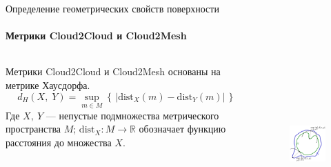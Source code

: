 \documentclass[aspectratio=169,xcolor=table]{beamer}
\begin{document}
\begin{frame}[t]{Определение геометрических свойств поверхности}
\framesubtitle{Метрики Cloud2Cloud и Cloud2Mesh}


\begin{columns}[T,onlytextwidth]
    \begin{column}{0.49\textwidth}
        Метрики Cloud2Cloud и Cloud2Mesh основаны на метрике Хаусдорфа.
\begin{equation*}
    d_{H}(X,\;Y)=\sup _{m\in M}\left\{\,|\mathrm {dist} _{X}(m)-\mathrm {dist} _{Y}(m)|\,\right\}
\end{equation*}
Где $X,\ Y$ --- непустые подмножества метрического пространства $M$; $\mathrm {dist} _{X}\colon M\to \mathbb {R}$ обозначает функцию расстояния до множества $X$.
    \end{column}
    \begin{column}{0.49\textwidth}
        \vspace{-0.8cm}
        \begin{figure}[H]
            \centering\includegraphics[height=6cm,width=1\textwidth,keepaspectratio]{Hausdorff_distance_sample.svg.png}
            \label{fig:Hausdorff_distance_sample.svg.png}
        \end{figure}
    \end{column}
\end{columns}



\end{frame}
\end{document}
